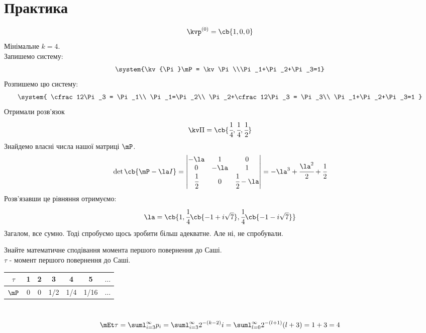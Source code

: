 \section{Практика}
\begin{tsk}
\begin{equation}
\kvp^{(0)} = \cb{1,0,0}
\end{equation}
Мінімальне $k=4$.\\
Запишемо систему:
\begin{equation}
\system{\kv{\Pi}\mP = \kv\Pi\\\Pi_1+\Pi_2+\Pi_3=1}
\end{equation}
Розпишемо цю систему:
\begin{equation}
\system{
\cfrac12\Pi_3 = \Pi_1\\ 
\Pi_1=\Pi_2\\
\Pi_2+\cfrac12\Pi_3 = \Pi_3\\
\Pi_1+\Pi_2+\Pi_3=1
}
\end{equation}
Отримали розв’язок
\begin{equation}
\kv\Pi = \cb{\cfrac14,\cfrac14,\cfrac12}
\end{equation}
Знайдемо власні числа нашої матриці $\mP$.\\
\begin{equation}
\det\cb{\mP-\la I} = \begin{vmatrix}
-\la & 1 & 0\\
0 & -\la & 1 \\
\cfrac12 & 0 & \cfrac12-\la
\end{vmatrix} = -\la^3+\cfrac{\la^2}2+ \cfrac12
\end{equation}
Розв’язавши це рівняння отримуємо:
\begin{equation}
\la = \cb{1,\cfrac14\cb{-1+i\sqrt7},\cfrac14\cb{-1-i\sqrt7}}
\end{equation}
Загалом, все сумно. Тоді спробуємо щось зробити більш адекватне. Але ні, не спробували.
\end{tsk}
\begin{tsk}
Знайте математичне сподівання момента першого повернення до Саші.\\
$\tau$ - момент першого повернення до Саші.\\
\begin{tabular}{|c|c|c|c|c|c|c|}
\hline
$\tau$ & 1 & 2 & 3  & 4 & 5 & $\ldots$\\
\hline
$\mP$ & 0 & 0 & 1/2 & 1/4 & 1/16 & $\ldots$ \\
\hline
\end{tabular}\\
\begin{equation}
\mEt\tau = \suml_{i=3}^\infty p_i = \suml_{i=3}^\infty 2^{-(k-2)} i = \suml_{l=0}^\infty 2^{-(l+1)} (l+3) = 1+3 = 4
\end{equation}
\end{tsk}

